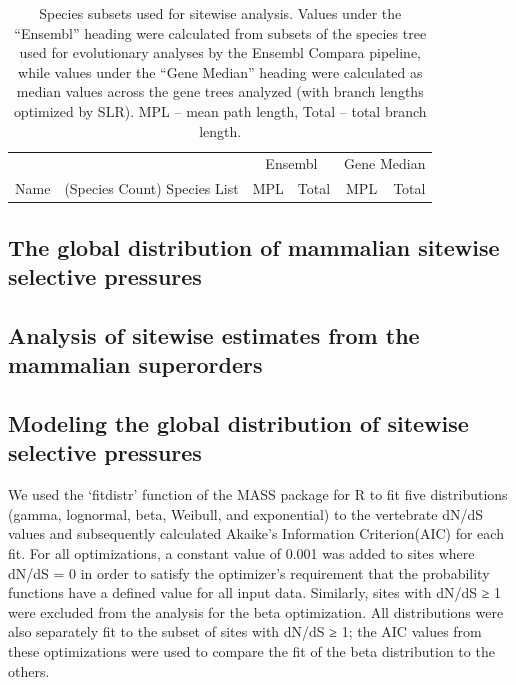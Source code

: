 \begin{table}[ht]
\centering \footnotesize
\begin{tabular}{lb{6cm}rrrr}
\toprule
 & &  \multicolumn{2}{c}{Ensembl} & \multicolumn{2}{c}{Gene Median} \\ \cmidrule(r){3-4} \cmidrule(r){5-6}
Name & (Species Count) Species List & MPL & Total & MPL & Total \\
  \midrule

\bottomrule
\end{tabular}
\caption{Species subsets used for sitewise analysis. Values under the
  ``Ensembl'' heading were calculated from subsets of the species tree
  used for evolutionary analyses by the Ensembl Compara pipeline,
  while values under the ``Gene Median'' heading were calculated as
  median values across the \ngenes gene trees analyzed (with branch
  lengths optimized by SLR). MPL -- mean path length, Total -- total
  branch length.}
\label{species_set_summary}
\end{table}

\subsection{The global distribution of mammalian sitewise selective pressures}



\subsection{Analysis of sitewise estimates from the mammalian superorders}


\subsection{Modeling the global distribution of sitewise selective pressures}

We used the ‘fitdistr’ function of the MASS package for R to fit five
distributions (gamma, lognormal, beta, Weibull, and exponential) to
the vertebrate dN/dS values and subsequently calculated Akaike’s
Information Criterion(AIC) for each fit. For all optimizations, a
constant value of 0.001 was added to sites where dN/dS = 0 in order to
satisfy the optimizer’s requirement that the probability functions
have a defined value for all input data. Similarly, sites with dN/dS ≥
1 were excluded from the analysis for the beta optimization. All
distributions were also separately fit to the subset of sites with
dN/dS ≥ 1; the AIC values from these optimizations were used to
compare the fit of the beta distribution to the others.

